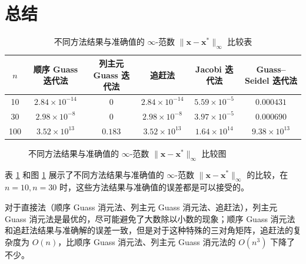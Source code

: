 \documentclass{sjtuarticle}
\begin{document}
\section{总结}

\begin{table}[H]
    \centering
    \caption{不同方法结果与准确值的 $\infty$-范数 $\lVert \bm{x}-\bm{x}^* \rVert_\infty$ 比较表}
    \label{tab:res}
    \begin{tabular}{cccccc}
        \toprule
        $n$ & 顺序 Guass 迭代法 & 列主元 Guass 迭代法 & 追赶法 & Jacobi 迭代法 & Guass--Seidel 迭代法 \\
        \midrule
        10  & $2.84\times 10^{-14}$ & 0       & $2.84\times 10^{-14}$ & $5.59\times 10^{-5}$ & $0.000431$           \\
        30  & $2.98\times 10^{-8}$  & 0       & $2.98\times 10^{-8}$  & $3.97\times 10^{-5}$ & $0.000690$           \\
        100 & $3.52\times 10^{13}$  & $0.183$ & $3.52\times 10^{13}$  & $1.64\times 10^{14}$ & $9.38\times 10^{13}$ \\
        \bottomrule
    \end{tabular}
\end{table}

\begin{figure}[h]
\centering
{}
\caption{不同方法结果与准确值的 $\infty$-范数 $\lVert \bm{x}-\bm{x}^* \rVert_\infty$ 比较图}
\label{fig:res}
\end{figure}

表 \ref{tab:res} 和图 \ref{fig:res} 展示了不同方法结果与准确值的 $\infty$-范数 $\lVert \bm{x}-\bm{x}^* \rVert_\infty$ 的比较，在 $n=10,n=30$ 时，这些方法结果与准确值的误差都是可以接受的。

对于直接法（顺序 Guass 消元法、列主元 Guass 消元法、追赶法），列主元 Guass 消元法是最优的，尽可能避免了大数除以小数的现象；顺序 Guass 消元法和追赶法结果与准确解的误差一致，但是对于这种特殊的三对角矩阵，追赶法的复杂度为 $O(n)$，比顺序 Guass 消元法、列主元 Guass 消元法的 $O(n^3)$ 下降了不少。
\end{document}
